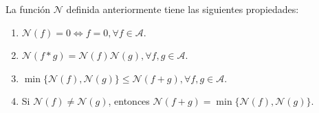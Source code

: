 \begin{proposition}
La función $\mathcal{N}$ definida anteriormente tiene las siguientes propiedades:
\begin{enumerate}[label=\textnormal{(\roman*)}]
    \item $\mathcal{N}(f)=0 \iff f=0, \forall f \in \mathcal{A}$.
    \item $\mathcal{N}(f*g)=\mathcal{N}(f)\mathcal{N}(g), \forall f,g \in \mathcal{A}$.
    \item $\min \{\mathcal{N}(f),\mathcal{N}(g)\}\leq \mathcal{N}(f+g), \forall f,g \in \mathcal{A}$. 
    \item Si $\mathcal{N}(f) \ne \mathcal{N}(g)$, entonces $\mathcal{N}(f+g)=\min \{ \mathcal{N}(f),\mathcal{N}(g) \}$.
\end{enumerate}
\end{proposition}
